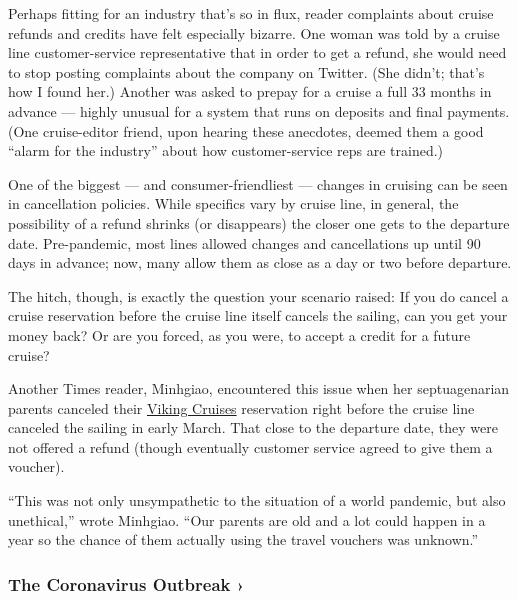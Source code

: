 Perhaps fitting for an industry that's so in flux, reader complaints
about cruise refunds and credits have felt especially bizarre. One woman
was told by a cruise line customer-service representative that in order
to get a refund, she would need to stop posting complaints about the
company on Twitter. (She didn't; that's how I found her.) Another was
asked to prepay for a cruise a full 33 months in advance --- highly
unusual for a system that runs on deposits and final payments. (One
cruise-editor friend, upon hearing these anecdotes, deemed them a good
``alarm for the industry'' about how customer-service reps are trained.)

One of the biggest --- and consumer-friendliest --- changes in cruising
can be seen in cancellation policies. While specifics vary by cruise
line, in general, the possibility of a refund shrinks (or disappears)
the closer one gets to the departure date. Pre-pandemic, most lines
allowed changes and cancellations up until 90 days in advance; now, many
allow them as close as a day or two before departure.

The hitch, though, is exactly the question your scenario raised: If you
do cancel a cruise reservation before the cruise line itself cancels the
sailing, can you get your money back? Or are you forced, as you were, to
accept a credit for a future cruise?

Another Times reader, Minhgiao, encountered this issue when her
septuagenarian parents canceled their
\href{https://www.vikingcruises.com/}{Viking Cruises} reservation right
before the cruise line canceled the sailing in early March. That close
to the departure date, they were not offered a refund (though eventually
customer service agreed to give them a voucher).

``This was not only unsympathetic to the situation of a world pandemic,
but also unethical,'' wrote Minhgiao. ``Our parents are old and a lot
could happen in a year so the chance of them actually using the travel
vouchers was unknown.''

\href{https://www.nytimes3xbfgragh.onion/news-event/coronavirus?action=click\&pgtype=Article\&state=default\&region=MAIN_CONTENT_3\&context=storylines_faq}{}

\hypertarget{the-coronavirus-outbreak-}{%
\subsubsection{The Coronavirus Outbreak
›}\label{the-coronavirus-outbreak-}}

